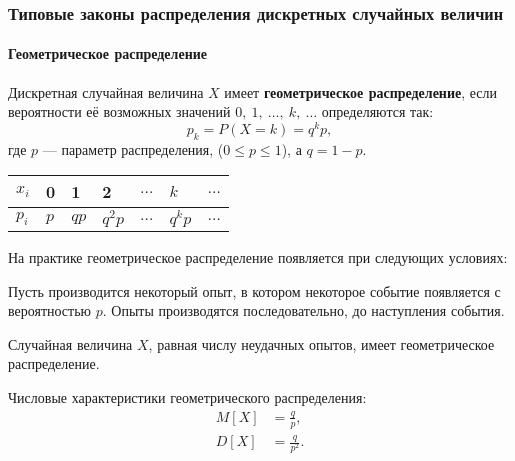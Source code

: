 \documentclass[a4paper]{article}
\newcommand{\sleq}{\leqslant}
\newcommand{\key}[1]{{\color{Medium}\bfseries #1}}
\begin{document}
            \subsubsection{Типовые законы распределения дискретных случайных величин}

                \paragraph{Геометрическое распределение}

                    Дискретная случайная величина $X$ имеет \key{геометрическое распределение}, если вероятности её возможных значений $0 , \: 1 , \: \ldots , \: k , \: \ldots$ определяются так:
                    \begin{equation*}
                        p_k = P(X = k) = q^k p ,
                    \end{equation*}
                    где $p$ --- параметр распределения, ($0 \sleq p \sleq 1$), а $q = 1 - p$.

                    \begin{tabular}{*{7}{|C{1.8cm}}|}
                        \hline
                        $x_i$ & 0 & 1 & 2 & $\ldots$ & $k$ & $\ldots$ \\
                        \hline
                        $p_i$ & $p$ & $q p$ & $q^2 p$ & $\ldots$ & $q^k p$ & $\ldots$ \\
                        \hline
                    \end{tabular}

                    На практике геометрическое распределение появляется при следующих условиях:
                    
                    Пусть производится некоторый опыт, в котором некоторое событие появляется с вероятностью $p$. Опыты производятся последовательно, до наступления события.
                    
                    Случайная величина $X$, равная числу неудачных опытов, имеет геометрическое распределение.
                    
                    Числовые характеристики геометрического распределения:
                    \begin{equation*}
                        \begin{aligned}
                            M[X] & = \frac{q}{p} , \\[1.0ex]
                            D[X] & = \frac{q}{p^2} .
                        \end{aligned}
                    \end{equation*}
\end{document}
